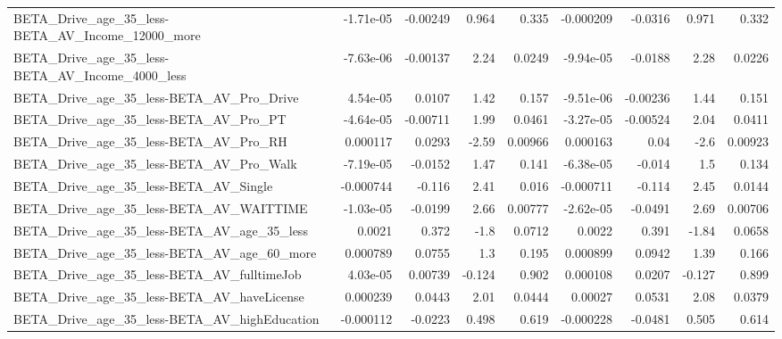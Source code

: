 \begin{tabular}{lrrrrrrrr}
BETA\_Drive\_age\_35\_less-BETA\_AV\_Income\_12000\_more   &   -1.71e-05 &     -0.00249 &     0.964 &    0.335 &  -0.000209 &     -0.0316 &        0.971 &         0.332 \\
BETA\_Drive\_age\_35\_less-BETA\_AV\_Income\_4000\_less    &   -7.63e-06 &     -0.00137 &      2.24 &   0.0249 &  -9.94e-05 &     -0.0188 &         2.28 &        0.0226 \\
BETA\_Drive\_age\_35\_less-BETA\_AV\_Pro\_Drive           &    4.54e-05 &       0.0107 &      1.42 &    0.157 &  -9.51e-06 &    -0.00236 &         1.44 &         0.151 \\
BETA\_Drive\_age\_35\_less-BETA\_AV\_Pro\_PT              &   -4.64e-05 &     -0.00711 &      1.99 &   0.0461 &  -3.27e-05 &    -0.00524 &         2.04 &        0.0411 \\
BETA\_Drive\_age\_35\_less-BETA\_AV\_Pro\_RH              &    0.000117 &       0.0293 &     -2.59 &  0.00966 &   0.000163 &        0.04 &         -2.6 &       0.00923 \\
BETA\_Drive\_age\_35\_less-BETA\_AV\_Pro\_Walk            &   -7.19e-05 &      -0.0152 &      1.47 &    0.141 &  -6.38e-05 &      -0.014 &          1.5 &         0.134 \\
BETA\_Drive\_age\_35\_less-BETA\_AV\_Single              &   -0.000744 &       -0.116 &      2.41 &    0.016 &  -0.000711 &      -0.114 &         2.45 &        0.0144 \\
BETA\_Drive\_age\_35\_less-BETA\_AV\_WAITTIME            &   -1.03e-05 &      -0.0199 &      2.66 &  0.00777 &  -2.62e-05 &     -0.0491 &         2.69 &       0.00706 \\
BETA\_Drive\_age\_35\_less-BETA\_AV\_age\_35\_less         &      0.0021 &        0.372 &      -1.8 &   0.0712 &     0.0022 &       0.391 &        -1.84 &        0.0658 \\
BETA\_Drive\_age\_35\_less-BETA\_AV\_age\_60\_more         &    0.000789 &       0.0755 &       1.3 &    0.195 &   0.000899 &      0.0942 &         1.39 &         0.166 \\
BETA\_Drive\_age\_35\_less-BETA\_AV\_fulltimeJob         &    4.03e-05 &      0.00739 &    -0.124 &    0.902 &   0.000108 &      0.0207 &       -0.127 &         0.899 \\
BETA\_Drive\_age\_35\_less-BETA\_AV\_haveLicense         &    0.000239 &       0.0443 &      2.01 &   0.0444 &    0.00027 &      0.0531 &         2.08 &        0.0379 \\
BETA\_Drive\_age\_35\_less-BETA\_AV\_highEducation       &   -0.000112 &      -0.0223 &     0.498 &    0.619 &  -0.000228 &     -0.0481 &        0.505 &         0.614 \\

\end{tabular}
